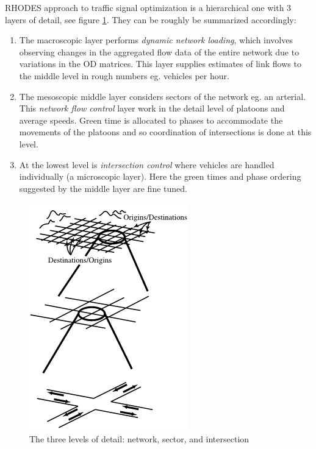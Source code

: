 RHODES approach to traffic signal optimization is a hierarchical one with 3 layers of detail, see figure \ref{fig:rhodes_hierarchi}. They can be roughly be summarized accordingly:

\begin{enumerate}
\item The macroscopic layer performs \textit{dynamic network loading}, which involves observing changes in the aggregated flow data of the entire network due to variations in the OD matrices. This layer supplies estimates of link flows to the middle level in rough numbers eg. vehicles per hour.
\item The mesoscopic middle layer considers sectors of the network eg. an arterial. This \textit{network flow control} layer work in the detail level of platoons and average speeds. Green time is allocated to phases to accommodate the movements of the platoons and so coordination of intersections is done at this level.
\item At the lowest level is \textit{intersection control} where vehicles are handled individually (a microscopic layer). Here the green times and phase ordering suggested by the middle layer are fine tuned.
\end{enumerate}

\begin{figure}[!ht]
\begin{center}
\includegraphics[scale=0.5]{rhodes_hierachy.png} 
\end{center}
\caption{The three levels of detail: network, sector, and intersection}
\label{fig:rhodes_hierarchi}
\end{figure}

